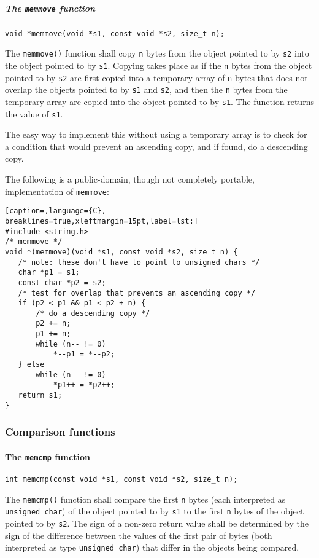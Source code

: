 \subparagraph{The \texttt{memmove} function}
\texttt{void *memmove(void *s1, const void *s2, size\_t n);}

The \texttt{memmove()} function shall copy \texttt{n} bytes from the object
pointed to by \texttt{s2} into the object pointed to by \texttt{s1}. Copying
takes place as if the \texttt{n} bytes from the object pointed to by
\texttt{s2} are first copied into a temporary array of \texttt{n} bytes that
does not overlap the objects pointed to by \texttt{s1} and \texttt{s2}, and
then the \texttt{n} bytes from the temporary array are copied into the object
pointed to by \texttt{s1}. The function returns the value of \texttt{s1}.

The easy way to implement this without using a temporary array is to check for
a condition that would prevent an ascending copy, and if found, do a descending
copy.

The following is a public-domain, though not completely portable,
implementation of \texttt{memmove}:
\lstset{basicstyle=\scriptsize, numbers=left, captionpos=b, tabsize=4}
\begin{lstlisting}[caption=,language={C},
breaklines=true,xleftmargin=15pt,label=lst:]
#include <string.h>
/* memmove */
void *(memmove)(void *s1, const void *s2, size_t n) {
   /* note: these don't have to point to unsigned chars */
   char *p1 = s1;
   const char *p2 = s2;
   /* test for overlap that prevents an ascending copy */
   if (p2 < p1 && p1 < p2 + n) {
	   /* do a descending copy */
	   p2 += n;
	   p1 += n;
	   while (n-- != 0) 
		   *--p1 = *--p2;
   } else 
	   while (n-- != 0) 
		   *p1++ = *p2++;
   return s1; 
}
\end{lstlisting}

\subsubsection{Comparison functions}

\paragraph{The \texttt{memcmp} function}
\texttt{int memcmp(const void *s1, const void *s2, size\_t n);}

The \texttt{memcmp()} function shall compare the first \texttt{n} bytes (each
interpreted as \texttt{unsigned char}) of the object pointed to by \texttt{s1}
to the first \texttt{n} bytes of the object pointed to by \texttt{s2}. The sign
of a non-zero return value shall be determined by the sign of the difference
between the values of the first pair of bytes (both interpreted as type
\texttt{unsigned char}) that differ in the objects being compared.

